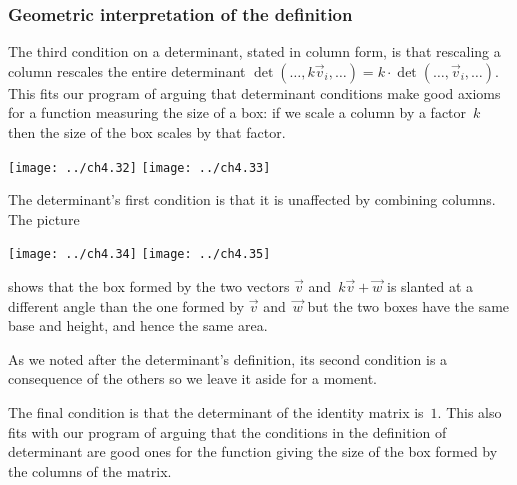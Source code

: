 \documentclass[10pt,t]{beamer}
\begin{document}
\begin{frame}\vspace*{-1ex}
  \frametitle{Geometric interpretation of the definition}
The third condition on a determinant, stated in column form, is 
that rescaling a column rescales the entire determinant
$\det(\ldots,k\vec{v}_i,\ldots)=k\cdot\det(\ldots,\vec{v}_i,\ldots)$.
This fits our program of arguing that determinant conditions make
good axioms for a function measuring the size of a box:
if we scale a column by a factor~$k$ then the size of the box
scales by that factor. 
\begin{center}
  \texttt{[image: ../ch4.32]}
  \qquad
  \texttt{[image: ../ch4.33]}
\end{center}

\pause
The determinant's first condition is that it is unaffected by 
combining columns.
The picture 
\begin{center}
  \texttt{[image: ../ch4.34]}
  \quad
  \texttt{[image: ../ch4.35]}
\end{center}   
shows that the box
formed by the two vectors $\vec{v}$ and~$k\vec{v}+\vec{w}$ 
is slanted at a different angle than the one formed
by $\vec{v}$ and~$\vec{w}$ but the two boxes have
the same base and height, and hence the same area.
\end{frame}
\begin{frame}
As we noted after the determinant's definition, 
its second condition is a consequence of the 
others so we leave it aside for a moment.  

The final condition is that the determinant of the identity matrix is~$1$.
This also fits 
with our program of arguing that the conditions in the 
definition of determinant are good ones for the function
giving the size of the box formed by the columns of the matrix.
\end{frame}
\end{document}
